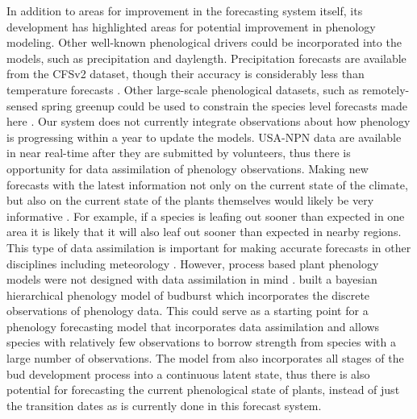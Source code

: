 In addition to areas for improvement in the forecasting system itself, its development has highlighted areas for potential improvement in phenology modeling. Other well-known phenological drivers could be incorporated into the models, such as precipitation and daylength. Precipitation forecasts are available from the CFSv2 dataset, though their accuracy is considerably less than temperature forecasts \citep{saha2014}. Other large-scale phenological datasets, such as remotely-sensed spring greenup could be used to constrain the species level forecasts made here \citep{melaas2016}. Our system does not currently integrate observations about how phenology is progressing within a year to update the models. USA-NPN data are available in near real-time after they are submitted by volunteers, thus there is opportunity for data assimilation of phenology observations. Making new forecasts with the latest information not only on the current state of the climate, but also on the current state of the plants themselves would likely be very informative \citep{luo2011, dietze2017}. For example, if a species is leafing out sooner than expected in one area it is likely that it will also leaf out sooner than expected in nearby regions. This type of data assimilation is important for making accurate forecasts in other disciplines including meteorology \citep{bauer2015, carrassi2018}. However, process based plant phenology models were not designed with data assimilation in mind \citep{chuine2013}. \cite{clark2014b} built a bayesian hierarchical phenology model of budburst which incorporates the discrete observations of phenology data. This could serve as a starting point for a phenology forecasting model that incorporates data assimilation and allows species with relatively few observations to borrow strength from species with a large number of observations. The model from \cite{clark2014b} also incorporates all stages of the bud development process into a continuous latent state, thus there is also potential for forecasting the current phenological state of plants, instead of just the transition dates as is currently done in this forecast system. 

\newpage


